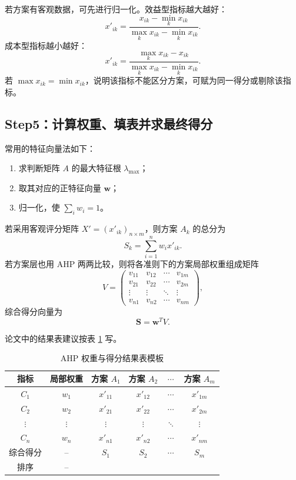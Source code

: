 \documentclass[UTF8,zihao=-4,fontset=none]{ctexart}
\begin{document}
若方案有客观数据，可先进行归一化。效益型指标越大越好：
\begin{equation}
  x'_{ik}=\frac{x_{ik}-\min_k x_{ik}}{\max_k x_{ik}-\min_k x_{ik}} .
\end{equation}
成本型指标越小越好：
\begin{equation}
  x'_{ik}=\frac{\max_k x_{ik}-x_{ik}}{\max_k x_{ik}-\min_k x_{ik}} .
\end{equation}
若 $\max x_{ik}=\min x_{ik}$，说明该指标不能区分方案，可赋为同一得分或剔除该指标。

\subsection{Step5：计算权重、填表并求最终得分}
常用的特征向量法如下：
\begin{enumerate}[leftmargin=2.2em]
  \item 求判断矩阵 $A$ 的最大特征根 $\lambda_{\max}$；
  \item 取其对应的正特征向量 $\bm w$；
  \item 归一化，使 $\sum_i w_i=1$。
\end{enumerate}

若采用客观评分矩阵 $X'=(x'_{ik})_{n\times m}$，则方案 $A_k$ 的总分为
\begin{equation}
  S_k=\sum_{i=1}^{n} w_i x'_{ik} .
\end{equation}
若方案层也用 AHP 两两比较，则将各准则下的方案局部权重组成矩阵
\begin{equation}
V=\begin{pmatrix}
 v_{11}&v_{12}&\cdots&v_{1m}\\
 v_{21}&v_{22}&\cdots&v_{2m}\\
 \vdots&\vdots&\ddots&\vdots\\
 v_{n1}&v_{n2}&\cdots&v_{nm}
\end{pmatrix},
\end{equation}
综合得分向量为
\begin{equation}
  \bm S=\bm w^T V .
\end{equation}

论文中的结果表建议按表 \ref{tab:result-template} 写。
\begin{table}[H]
\centering
\caption{AHP 权重与得分结果表模板}
\label{tab:result-template}
\begin{tabular}{cccccc}
\toprule
指标 & 局部权重 & 方案 $A_1$ & 方案 $A_2$ & $\cdots$ & 方案 $A_m$\\
\midrule
$C_1$ & $w_1$ & $x'_{11}$ & $x'_{12}$ & $\cdots$ & $x'_{1m}$\\
$C_2$ & $w_2$ & $x'_{21}$ & $x'_{22}$ & $\cdots$ & $x'_{2m}$\\
$\vdots$ & $\vdots$ & $\vdots$ & $\vdots$ & $\ddots$ & $\vdots$\\
$C_n$ & $w_n$ & $x'_{n1}$ & $x'_{n2}$ & $\cdots$ & $x'_{nm}$\\
\midrule
综合得分 & -- & $S_1$ & $S_2$ & $\cdots$ & $S_m$\\
排序 & -- &  &  &  & \\
\bottomrule
\end{tabular}
\end{table}
\end{document}
